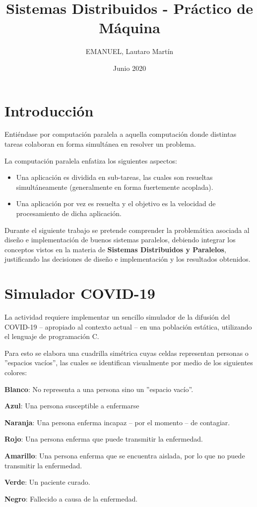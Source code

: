 \documentclass[a4paper,12pt]{article}
\begin{document}
\title{\textbf{Sistemas Distribuidos - Práctico de Máquina}}
\author{EMANUEL, Lautaro Martín}
\date{Junio 2020}
\maketitle

\tableofcontents
\pagebreak

\section{Introducción}

Entiéndase por computación paralela a aquella computación donde distintas tareas colaboran en forma simultánea en resolver
un problema.

La computación paralela enfatiza los siguientes aspectos:
\begin{itemize}
    \item Una aplicación es dividida en sub-tareas, las cuales son resueltas simultáneamente (generalmente en forma fuertemente acoplada).
    \item Una aplicación por vez es resuelta y el objetivo es la velocidad de procesamiento de dicha aplicación.
\end{itemize}

Durante el siguiente trabajo se pretende comprender la problemática asociada al diseño e implementación de buenos sistemas paralelos, debiendo integrar los conceptos vistos en la materia de \textbf{Sistemas Distribuidos y Paralelos}, justificando las decisiones de diseño e implementación y los resultados obtenidos.

\section{Simulador COVID-19}

La actividad requiere implementar un sencillo simulador de la difusión del COVID-19 -- apropiado al contexto actual -- en una población estática, utilizando el lenguaje de programación C.

Para esto se elabora una cuadrilla simétrica cuyas celdas representan personas o ''espacios vacíos'', las cuales se identifican visualmente por medio de los siguientes colores:
\begin{description}[leftmargin=!]
    \item \textbf{Blanco}: No representa a una persona sino un ''espacio vacío''.
    \item \textbf{Azul}: Una persona susceptible a enfermarse
    \item \textbf{Naranja}: Una persona enferma incapaz -- por el momento -- de contagiar.
    \item \textbf{Rojo}: Una persona enferma que puede transmitir la enfermedad.
    \item \textbf{Amarillo}: Una persona enferma que se encuentra aislada, por lo que no puede transmitir la enfermedad.
    \item \textbf{Verde}: Un paciente curado.
    \item \textbf{Negro}: Fallecido a causa de la enfermedad.
\end{description}
\end{document}
